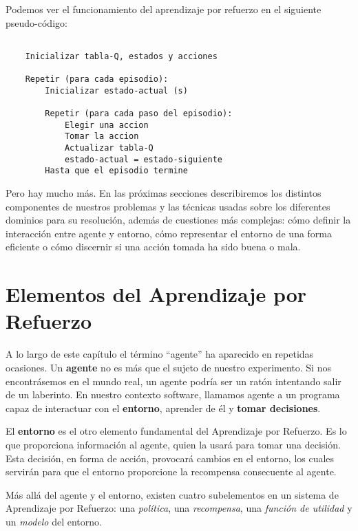 Podemos ver el funcionamiento del aprendizaje por refuerzo en el siguiente pseudo-código:

\begin{minipage}{0.9\linewidth}%
    \begin{lstlisting}[frame=tb, caption=Pseudocódigo Aprendizaje por Refuerzo,   inputencoding=latin1, label=code:q-learning]
    
    Inicializar tabla-Q, estados y acciones
    
    Repetir (para cada episodio):
        Inicializar estado-actual (s)
        
        Repetir (para cada paso del episodio):
            Elegir una accion
            Tomar la accion
            Actualizar tabla-Q
            estado-actual = estado-siguiente
        Hasta que el episodio termine
    \end{lstlisting}%
\end{minipage}

Pero hay mucho más. En las próximas secciones describiremos los distintos componentes de nuestros problemas y las técnicas usadas sobre los diferentes dominios para su resolución, además de cuestiones más complejas: cómo definir la interacción entre agente y entorno, cómo representar el entorno de una forma eficiente o cómo discernir si una acción tomada ha sido buena o mala.


\section{Elementos del Aprendizaje por Refuerzo}

A lo largo de este capítulo el término ``agente'' ha aparecido en repetidas ocasiones. Un \textbf{agente} no es más que el sujeto de nuestro experimento. Si nos encontrásemos en el mundo real, un agente podría ser un ratón intentando salir de un laberinto. En nuestro contexto software, llamamos agente a un programa capaz de interactuar con el \textbf{entorno}, aprender de él y \textbf{tomar decisiones}.

El \textbf{entorno} es el otro elemento fundamental del Aprendizaje por Refuerzo. Es lo que proporciona información al agente, quien la usará para tomar una decisión. Esta decisión, en forma de acción, provocará cambios en el entorno, los cuales servirán para que el entorno proporcione la recompensa consecuente al agente.

Más allá del agente y el entorno, existen cuatro subelementos en un sistema de Aprendizaje por Refuerzo: una \textit{política}, una \textit{recompensa}, una \textit{función de utilidad} y un \textit{modelo} del entorno.

